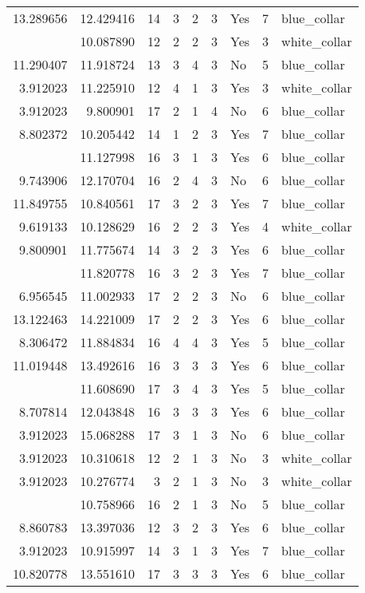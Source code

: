 \documentclass[
]{article}
\begin{document}
\begin{longtable}[t]{rrrrrllrl}
13.289656 & 12.429416 & 14 & 3 & 2 & 3 & Yes & 7 & blue\_collar\\
\addlinespace
4.382027 & 10.087890 & 12 & 2 & 2 & 3 & Yes & 3 & white\_collar\\
11.290407 & 11.918724 & 13 & 3 & 4 & 3 & No & 5 & blue\_collar\\
3.912023 & 11.225910 & 12 & 4 & 1 & 3 & Yes & 3 & white\_collar\\
3.912023 & 9.800901 & 17 & 2 & 1 & 4 & No & 6 & blue\_collar\\
8.802372 & 10.205442 & 14 & 1 & 2 & 3 & Yes & 7 & blue\_collar\\
\addlinespace
3.912023 & 11.127998 & 16 & 3 & 1 & 3 & Yes & 6 & blue\_collar\\
9.743906 & 12.170704 & 16 & 2 & 4 & 3 & No & 6 & blue\_collar\\
11.849755 & 10.840561 & 17 & 3 & 2 & 3 & Yes & 7 & blue\_collar\\
9.619133 & 10.128629 & 16 & 2 & 2 & 3 & Yes & 4 & white\_collar\\
9.800901 & 11.775674 & 14 & 3 & 2 & 3 & Yes & 6 & blue\_collar\\
\addlinespace
10.343354 & 11.820778 & 16 & 3 & 2 & 3 & Yes & 7 & blue\_collar\\
6.956545 & 11.002933 & 17 & 2 & 2 & 3 & No & 6 & blue\_collar\\
13.122463 & 14.221009 & 17 & 2 & 2 & 3 & Yes & 6 & blue\_collar\\
8.306472 & 11.884834 & 16 & 4 & 4 & 3 & Yes & 5 & blue\_collar\\
11.019448 & 13.492616 & 16 & 3 & 3 & 3 & Yes & 6 & blue\_collar\\
\addlinespace
12.043848 & 11.608690 & 17 & 3 & 4 & 3 & Yes & 5 & blue\_collar\\
8.707814 & 12.043848 & 16 & 3 & 3 & 3 & Yes & 6 & blue\_collar\\
3.912023 & 15.068288 & 17 & 3 & 1 & 3 & No & 6 & blue\_collar\\
3.912023 & 10.310618 & 12 & 2 & 1 & 3 & No & 3 & white\_collar\\
3.912023 & 10.276774 & 3 & 2 & 1 & 3 & No & 3 & white\_collar\\
\addlinespace
3.912023 & 10.758966 & 16 & 2 & 1 & 3 & No & 5 & blue\_collar\\
8.860783 & 13.397036 & 12 & 3 & 2 & 3 & Yes & 6 & blue\_collar\\
3.912023 & 10.915997 & 14 & 3 & 1 & 3 & Yes & 7 & blue\_collar\\
10.820778 & 13.551610 & 17 & 3 & 3 & 3 & Yes & 6 & blue\_collar\\

\end{longtable}
\end{document}
